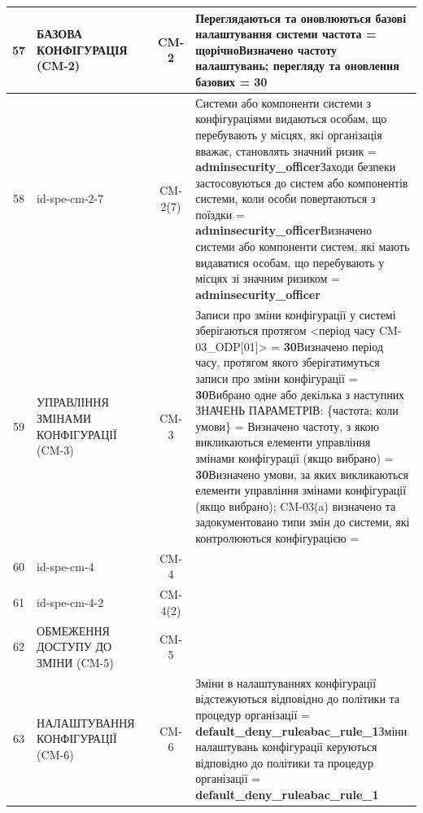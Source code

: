 \documentclass[10pt]{article}
\begin{document}
\begin{longtable}{|c|>{\raggedright\arraybackslash}p{2.5cm}|>{\raggedright\arraybackslash}p{4.5cm}|c|>{\raggedright\arraybackslash}p{4.5cm}|}
57 & БАЗОВА КОНФІГУРАЦІЯ (CM-2) &  & CM-2 & Переглядаються та оновлюються базові налаштування системи частота = \textbf{щорічно}\newline Визначено частоту налаштувань; перегляду та оновлення базових = \textbf{30} \\ \hline
58 & id-spe-cm-2-7 &  & CM-2(7) & Системи або компоненти системи з конфігураціями видаються особам, що перебувають у місцях, які організація вважає, становлять значний ризик = \textbf{adminsecurity\_\allowbreak{}officer}\newline Заходи безпеки застосовуються до систем або компонентів системи, коли особи повертаються з поїздки = \textbf{adminsecurity\_\allowbreak{}officer}\newline Визначено системи або компоненти систем, які мають видаватися особам, що перебувають у місцях зі значним ризиком = \textbf{adminsecurity\_\allowbreak{}officer} \\ \hline
59 & УПРАВЛІННЯ ЗМІНАМИ КОНФІГУРАЦІЇ (CM-3) &  & CM-3 & Записи про зміни конфігурації у системі зберігаються протягом <період часу CM-03\_\allowbreak{}ODP[01]> = \textbf{30}\newline Визначено період часу, протягом якого зберігатимуться записи про зміни конфігурації = \textbf{30}\newline Вибрано одне або декілька з наступних ЗНАЧЕНЬ ПАРАМЕТРІВ: \{частота; коли умови\} = \textbf{}\newline Визначено частоту, з якою викликаються елементи управління змінами конфігурації (якщо вибрано) = \textbf{30}\newline Визначено умови, за яких викликаються елементи управління змінами конфігурації (якщо вибрано); CM-03(a) визначено та задокументовано типи змін до системи, які контролюються конфігурацією = \textbf{} \\ \hline
60 & id-spe-cm-4 &  & CM-4 &  \\ \hline
61 & id-spe-cm-4-2 &  & CM-4(2) &  \\ \hline
62 & ОБМЕЖЕННЯ ДОСТУПУ ДО ЗМІНИ (CM-5) &  & CM-5 &  \\ \hline
63 & НАЛАШТУВАННЯ КОНФІГУРАЦІЇ (CM-6) &  & CM-6 & Зміни в налаштуваннях конфігурації відстежуються відповідно до політики та процедур організації = \textbf{default\_\allowbreak{}deny\_\allowbreak{}ruleabac\_\allowbreak{}rule\_\allowbreak{}1}\newline Зміни налаштувань конфігурації керуються відповідно до політики та процедур організації = \textbf{default\_\allowbreak{}deny\_\allowbreak{}ruleabac\_\allowbreak{}rule\_\allowbreak{}1} \\ \hline

\end{longtable}
\end{document}
